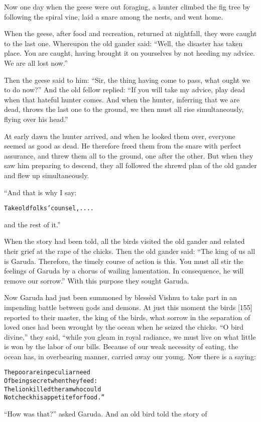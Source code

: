 \documentclass{article}
\renewenvironment{verbatim}{\begin{alltt}\normalfont\begin{centering}}{\end{centering}\end{alltt}}
\begin{document}
Now one day when the geese were out foraging, a hunter climbed the
fig tree by following the spiral vine, laid a snare among the
nests, and went home.

When the geese, after food and recreation, returned at nightfall,
they were caught to the last one. Whereupon the old gander said:
``Well, the disaster has taken place. You are caught, having brought it on yourselves by not heeding my advice. We are all lost now.''

Then the geese said to him:
``Sir, the thing having come to pass, what ought we to do now?''
And the old fellow replied:
``If you will take my advice, play dead when that hateful hunter comes. And when the hunter, inferring that we are dead, throws the last one to the ground, we then must all rise simultaneously, flying over his head.''

At early dawn the hunter arrived, and when he looked them over,
everyone seemed as good as dead. He therefore freed them from the
snare with perfect assurance, and threw them all to the ground, one
after the other. But when they saw him preparing to descend, they
all followed the shrewd plan of the old gander and flew up
simultaneously.

“And that is why I say:

\begin{verbatim}
Take old folks' counsel, ....
\end{verbatim}
and the rest of it.”

When the story had been told, all the birds visited the old gander
and related their grief at the rape of the chicks. Then the old
gander said:
``The king of us all is Garuda. Therefore, the timely course of action is this. You must all stir the feelings of Garuda by a chorus of wailing lamentation. In consequence, he will remove our sorrow.''
With this purpose they sought Garuda.

Now Garuda had just been summoned by blessèd Vishnu to take part in
an impending battle between gods and demons. At just this moment
the birds [155] reported to their master, the king of the birds,
what sorrow in the separation of loved ones had been wrought by the
ocean when he seized the chicks. ``O bird divine,'' they said,
“while you gleam in royal radiance, we must live on what little is
won by the labor of our bills. Because of our weak necessity of
eating, the ocean has, in overbearing manner, carried away our
young. Now there is a saying:

\begin{verbatim}
The poor are in peculiar need
Of being secret when they feed:
The lion killed the ram who could
Not check his appetite for food.”
\end{verbatim}
``How was that?'' asked Garuda. And an old bird told the story of
\end{document}
